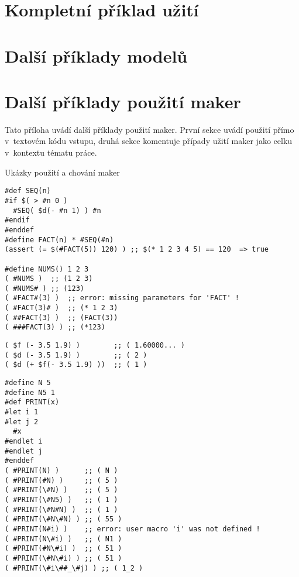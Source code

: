 \documentclass[thesis=M,czech]{FITthesis}[2012/06/26]
\begin{document}
\chapter{Kompletní příklad užití}


\chapter{Další příklady modelů}


\chapter{Další příklady použití maker}\label{appendix:macros}
Tato příloha uvádí další příklady použití maker.
První sekce uvádí použití přímo v~textovém kódu vstupu,
druhá sekce komentuje případy užití maker jako celku
v~kontextu tématu práce.


\begin{section}{Ukázky použití a chování maker}\label{s:macros:examples}
\begin{Verbatim}[samepage=true]
#def SEQ(n)
#if $( > #n 0 )
  #SEQ( $d(- #n 1) ) #n
#endif
#enddef
#define FACT(n) * #SEQ(#n)
(assert (= $(#FACT(5)) 120) ) ;; $(* 1 2 3 4 5) == 120  => true

#define NUMS() 1 2 3
( #NUMS )  ;; (1 2 3)
( #NUMS# ) ;; (123)
( #FACT#(3) )  ;; error: missing parameters for 'FACT' !
( #FACT(3)# )  ;; (* 1 2 3)
( ##FACT(3) )  ;; (FACT(3))
( ###FACT(3) ) ;; (*123)
\end{Verbatim}
\begin{Verbatim}[samepage=true]
( $f (- 3.5 1.9) )        ;; ( 1.60000... )
( $d (- 3.5 1.9) )        ;; ( 2 )
( $d (+ $f(- 3.5 1.9) ))  ;; ( 1 )
\end{Verbatim}
\begin{Verbatim}[samepage=true]
#define N 5
#define N5 1
#def PRINT(x)
#let i 1
#let j 2
  #x
#endlet i
#endlet j
#enddef
( #PRINT(N) )      ;; ( N )
( #PRINT(#N) )     ;; ( 5 )
( #PRINT(\#N) )    ;; ( 5 )
( #PRINT(\#N5) )   ;; ( 1 )
( #PRINT(\#N#N) )  ;; ( 1 )
( #PRINT(\#N\#N) ) ;; ( 55 )
( #PRINT(N#i) )    ;; error: user macro 'i' was not defined !
( #PRINT(N\#i) )   ;; ( N1 )
( #PRINT(#N\#i) )  ;; ( 51 )
( #PRINT(\#N\#i) ) ;; ( 51 )
( #PRINT(\#i\##_\#j) ) ;; ( 1_2 )
\end{Verbatim}
\end{section} %
\end{document}
